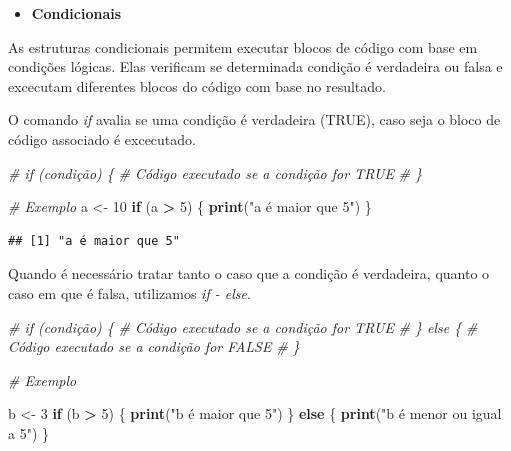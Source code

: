 \documentclass[
]{book}
\newenvironment{Shaded}{\begin{snugshade}}{\end{snugshade}}
\newcommand{\CommentTok}[1]{\textcolor[rgb]{0.56,0.35,0.01}{\textit{#1}}}
\newcommand{\ControlFlowTok}[1]{\textcolor[rgb]{0.13,0.29,0.53}{\textbf{#1}}}
\newcommand{\DecValTok}[1]{\textcolor[rgb]{0.00,0.00,0.81}{#1}}
\newcommand{\FunctionTok}[1]{\textcolor[rgb]{0.13,0.29,0.53}{\textbf{#1}}}
\newcommand{\NormalTok}[1]{#1}
\newcommand{\OtherTok}[1]{\textcolor[rgb]{0.56,0.35,0.01}{#1}}
\newcommand{\SpecialCharTok}[1]{\textcolor[rgb]{0.81,0.36,0.00}{\textbf{#1}}}
\newcommand{\StringTok}[1]{\textcolor[rgb]{0.31,0.60,0.02}{#1}}
\providecommand{\tightlist}{%
  \setlength{\itemsep}{0pt}\setlength{\parskip}{0pt}}
\begin{document}
\begin{itemize}
\tightlist
\item
  \textbf{Condicionais}
\end{itemize}

As estruturas condicionais permitem executar blocos de código com base em condições lógicas. Elas verificam se determinada condição é verdadeira ou falsa e excecutam diferentes blocos do código com base no resultado.

O comando \emph{if} avalia se uma condição é verdadeira (TRUE), caso seja o bloco de código associado é excecutado.

\begin{Shaded}
\begin{Highlighting}[]
\CommentTok{\# if (condição) \{}
  \CommentTok{\# Código executado se a condição for TRUE}
\CommentTok{\# \}}

\CommentTok{\# Exemplo}
\NormalTok{a }\OtherTok{\textless{}{-}} \DecValTok{10}
\ControlFlowTok{if}\NormalTok{ (a }\SpecialCharTok{\textgreater{}} \DecValTok{5}\NormalTok{) \{}
  \FunctionTok{print}\NormalTok{(}\StringTok{"a é maior que 5"}\NormalTok{)}
\NormalTok{\}}
\end{Highlighting}
\end{Shaded}

\begin{verbatim}
## [1] "a é maior que 5"
\end{verbatim}

Quando é necessário tratar tanto o caso que a condição é verdadeira, quanto o caso em que é falsa, utilizamos \emph{if - else}.

\begin{Shaded}
\begin{Highlighting}[]
\CommentTok{\# if (condição) \{}
  \CommentTok{\# Código executado se a condição for TRUE}
\CommentTok{\# \} else \{}
  \CommentTok{\# Código executado se a condição for FALSE}
\CommentTok{\# \}}

\CommentTok{\# Exemplo}

\NormalTok{b }\OtherTok{\textless{}{-}} \DecValTok{3}
\ControlFlowTok{if}\NormalTok{ (b }\SpecialCharTok{\textgreater{}} \DecValTok{5}\NormalTok{) \{}
  \FunctionTok{print}\NormalTok{(}\StringTok{"b é maior que 5"}\NormalTok{)}
\NormalTok{\} }\ControlFlowTok{else}\NormalTok{ \{}
  \FunctionTok{print}\NormalTok{(}\StringTok{"b é menor ou igual a 5"}\NormalTok{)}
\NormalTok{\}}
\end{Highlighting}
\end{Shaded}
\end{document}

